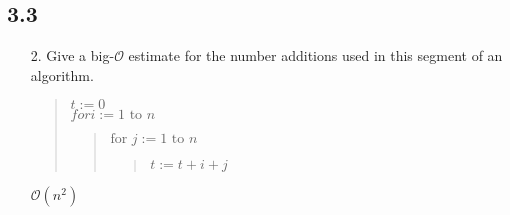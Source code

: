 \subsection{3.3}
\begin{itemize}
    \item[2.] Give a big-$\mathcal{O}$ estimate for the number additions used in this segment of an algorithm.

          \begin{quote}
              $t := 0$\\
              $for i := 1 \text{ to } n$
              \begin{quote}
                  $\text{for $j$}:= 1 \text{ to } n$
                  \begin{quote}
                      $t := t + i + j$
                  \end{quote}
              \end{quote}
          \end{quote}

          \answer \quad $\mathcal{O}(n^2)$


\end{itemize}
